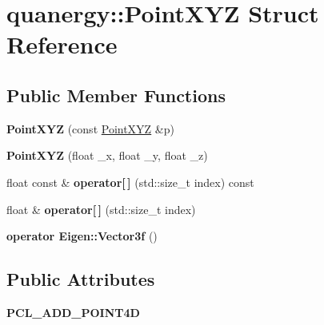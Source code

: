 \hypertarget{structquanergy_1_1PointXYZ}{\section{quanergy\-:\-:Point\-X\-Y\-Z Struct Reference}
\label{structquanergy_1_1PointXYZ}
}
\subsection*{Public Member Functions}
\begin{DoxyCompactItemize}
\item 
\hypertarget{structquanergy_1_1PointXYZ_a66dc064b33f4ddddec22feda217d0606}{{\bfseries Point\-X\-Y\-Z} (const \hyperlink{structquanergy_1_1PointXYZ}{Point\-X\-Y\-Z} \&p)}\label{structquanergy_1_1PointXYZ_a66dc064b33f4ddddec22feda217d0606}

\item 
\hypertarget{structquanergy_1_1PointXYZ_af9c1f7a49d10418a180452f0ebfbf9fa}{{\bfseries Point\-X\-Y\-Z} (float \-\_\-x, float \-\_\-y, float \-\_\-z)}\label{structquanergy_1_1PointXYZ_af9c1f7a49d10418a180452f0ebfbf9fa}

\item 
\hypertarget{structquanergy_1_1PointXYZ_aa886f6bc333e85307def00cf6f2781d1}{float const \& {\bfseries operator\mbox{[}$\,$\mbox{]}} (std\-::size\-\_\-t index) const }\label{structquanergy_1_1PointXYZ_aa886f6bc333e85307def00cf6f2781d1}

\item 
\hypertarget{structquanergy_1_1PointXYZ_a799b1cf78698e4127fe2b449b5e38901}{float \& {\bfseries operator\mbox{[}$\,$\mbox{]}} (std\-::size\-\_\-t index)}\label{structquanergy_1_1PointXYZ_a799b1cf78698e4127fe2b449b5e38901}

\item 
\hypertarget{structquanergy_1_1PointXYZ_ac36f4072a6cff855cf4ec56d1a1d5314}{{\bfseries operator Eigen\-::\-Vector3f} ()}\label{structquanergy_1_1PointXYZ_ac36f4072a6cff855cf4ec56d1a1d5314}

\end{DoxyCompactItemize}
\subsection*{Public Attributes}
\begin{DoxyCompactItemize}
\item 
\hypertarget{structquanergy_1_1PointXYZ_a05f1335cc8583558284b700c1eecd808}{{\bfseries P\-C\-L\-\_\-\-A\-D\-D\-\_\-\-P\-O\-I\-N\-T4\-D}}\label{structquanergy_1_1PointXYZ_a05f1335cc8583558284b700c1eecd808}

\end{DoxyCompactItemize}

